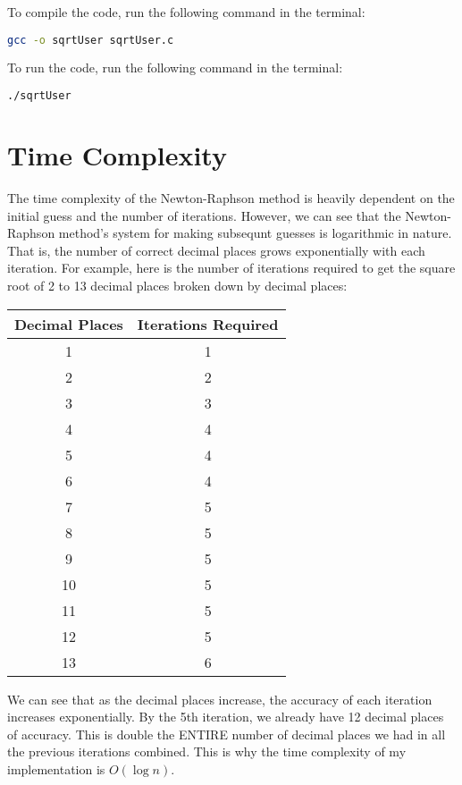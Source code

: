 \documentclass[12pt,letterpaper]{article}
\begin{document}
To compile the code, run the following command in the terminal:

\begin{lstlisting}[language=bash]
gcc -o sqrtUser sqrtUser.c
\end{lstlisting}

To run the code, run the following command in the terminal:

\begin{lstlisting}[language=bash]
./sqrtUser
\end{lstlisting}

\section{Time Complexity}

The time complexity of the Newton-Raphson method is heavily dependent on the initial guess and the number of iterations.
However, we can see that the Newton-Raphson method's system for making subsequnt guesses is logarithmic in nature.
That is, the number of correct decimal places grows exponentially with each iteration.
For example, here is the number of iterations required to get the square root of 2 to 13 decimal places broken down by decimal places:

\begin{center}
	\begin{tabular}{|c|c|}
		\hline
		\textbf{Decimal Places} & \textbf{Iterations Required} \\
		\hline
		1 & 1 \\
		2 & 2 \\
		3 & 3 \\
		4 & 4 \\
		5 & 4 \\
		6 & 4 \\
		7 & 5 \\
		8 & 5 \\
		9 & 5 \\
		10 & 5 \\
		11 & 5 \\
		12 & 5 \\
		13 & 6 \\
		\hline
	\end{tabular}
\end{center}

We can see that as the decimal places increase, the accuracy of each iteration increases exponentially.
By the 5th iteration, we already have 12 decimal places of accuracy.
This is double the ENTIRE number of decimal places we had in all the previous iterations combined.
This is why the time complexity of my implementation is $O(\log n)$.
\end{document}
